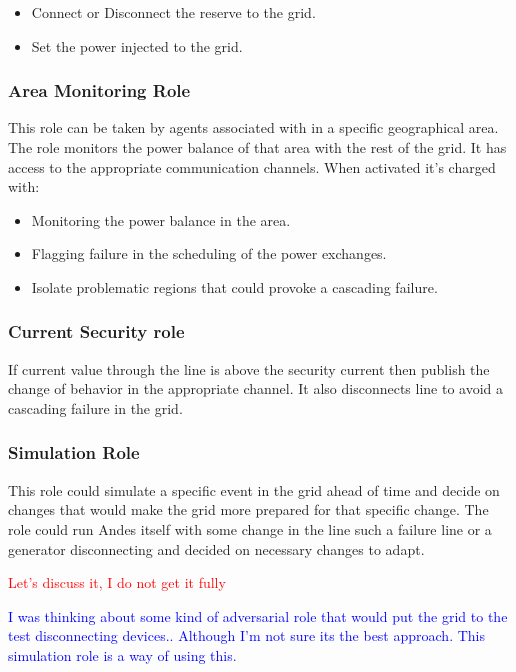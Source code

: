 \documentclass{article}
\begin{document}
\begin{itemize}
    \item Connect or Disconnect the reserve to the grid.
    \item Set the power injected to the grid.
\end{itemize}

\subsubsection*{Area Monitoring Role}

This role can be taken by agents associated with in a specific geographical area. The role monitors the power balance of that area with the rest of the grid. It has access to the appropriate communication channels. When activated it's charged with:
\begin{itemize}
    \item Monitoring the power balance in the area. 
    \item Flagging failure in the scheduling of the power exchanges.
    \item Isolate problematic regions that could provoke a cascading failure.
\end{itemize}

\subsubsection*{Current Security role}
If current value through the line is above the security current then publish the change of behavior in the appropriate channel. It also disconnects line to avoid a cascading failure in the grid.

\subsubsection*{Simulation Role}
This role could simulate a specific event in the grid ahead of time and decide on changes that would make the grid more prepared for that specific change. The role could run Andes itself with some change in the line such a failure line or a generator disconnecting and decided on necessary changes to adapt.

\textcolor{red}{Let's discuss it, I do not get it fully}

\textcolor{blue}{I was thinking about some kind of adversarial role that would put the grid to the test disconnecting devices.. Although I'm not sure its the best approach. This simulation role is a way of using this.}
\end{document}
